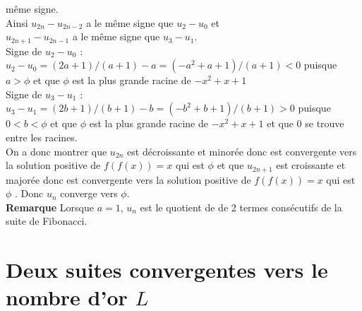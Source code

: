 \documentclass[a4paper,11pt]{book}
\begin{document}
\begin{enumerate}
m\^eme signe.\\
Ainsi $u_{2n}-u_{2n-2}$ a le m\^eme signe que  $u_2-u_0$ et\\
$u_{2n+1}-u_{2n-1}$ a le m\^eme signe que  $u_3-u_1$.\\
Signe de $u_2-u_0$ :\\
$u_2-u_0=(2a+1)/(a+1)-a=(-a^2+a+1)/(a+1)<0$ puisque $a>\phi$ et que $\phi$ est la 
plus grande racine de  $-x^2+x+1$\\
Signe de $u_3-u_1$ :\\
$u_3-u_1=(2b+1)/(b+1)-b=(-b^2+b+1)/(b+1)>0$ puisque $0<b<\phi$ et que $\phi$ est la 
plus grande racine de  $-x^2+x+1$ et que 0 se trouve entre les racines.\\
On a donc montrer que $u_{2n}$ est d\'ecroissante et minor\'ee donc est 
convergente vers la solution positive de $f(f(x))=x$ qui est $\phi$ 
et que $u_{2n+1}$ est croissante et major\'ee donc est convergente
vers la solution positive de $f(f(x))=x$ qui est $\phi$ .
Donc $u_n$ converge vers $\phi$.\\
{\bf Remarque} Lorsque $a=1$, $u_n$ est le quotient de de 2 termes cons\'ecutifs
de la suite de Fibonacci.
\end{enumerate}
\section{Deux suites convergentes vers le nombre d'or $L$} 
\end{document}
